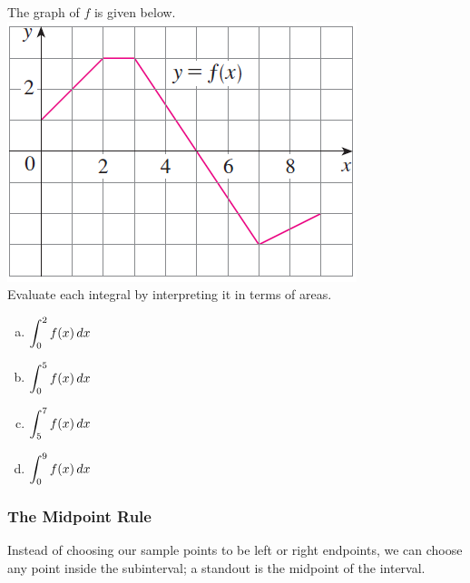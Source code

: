 \documentclass[notes]{subfiles}
\begin{document}
		\begin{ex}
			The graph of $f$ is given below.\\
			\includegraphics{4.2fig1}\\
			Evaluate each integral by interpreting it in terms of areas.
			\begin{enumerate}[(a)]
				\item $\displaystyle \int_0^2 f(x)\, dx$
					
				\item $\displaystyle \int_0^5 f(x)\, dx$
					
				\item $\displaystyle \int_5^7 f(x)\, dx$
					
				\item $\displaystyle \int_0^9 f(x)\, dx$
			\end{enumerate}
		\end{ex}
			\newpage
			
	\subsubsection*{The Midpoint Rule}
		Instead of choosing our sample points to be left or right endpoints, we can choose any point inside the subinterval; a standout is the midpoint of the interval.  
			\begin{defn}
			\end{defn}
			
\end{document}
